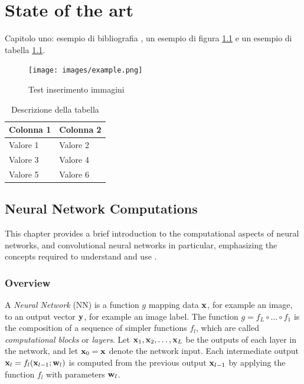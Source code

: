 \chapter{State of the art}
\label{stato dell'arte}


Capitolo uno: 
esempio di bibliografia \cite{2015arXiv150200046K}, un esempio di figura \ref{figure:test inserimento} e un esempio di tabella \ref{table:esempio_tabella}.

\begin{figure}
	\centering
	\texttt{[image: images/example.png]}
	\caption{Test inserimento immagini}
	\label{figure:test inserimento}
\end{figure}

\begin{table}[!htbp]
	\centering
	\begin{tabular}{l|l}
		\toprule
		Colonna 1 & Colonna 2 \\
		\midrule
		Valore 1 & Valore 2 \\
		Valore 3 & Valore 4 \\
		Valore 5 & Valore 6 \\
		\bottomrule
	\end{tabular}
	\caption{Descrizione della tabella}
	\label{table:esempio_tabella}
\end{table}


\section{Neural Network Computations}\label{s:fundamentals}

This chapter provides a brief introduction to the computational aspects of neural networks, and convolutional neural networks in particular, emphasizing the concepts required to understand and use \matconvnet.

\subsection{Overview}\label{s:cnn-structure}

A \emph{Neural Network} (NN) is a function $g$ mapping data $\mathbf{x}$, for example an image, to an output vector $\mathbf{y}$, for example an image label. The function $g=f_L \circ \dots \circ f_1$ is the composition of a sequence of simpler functions $f_l$, which are called \emph{computational blocks} or \emph{layers}. Let $\mathbf{x}_1,\mathbf{x}_2,\dots,\mathbf{x}_L$ be the outputs of each layer in the network, and let $\mathbf{x}_0=\mathbf{x}$ denote the network input. Each intermediate output $\mathbf{x}_l = f_l(\mathbf{x}_{l-1};\mathbf{w}_l)$ is computed from the previous output $\mathbf{x}_{l-1}$  by applying the function $f_l$ with parameters $\mathbf{w}_l$. 

